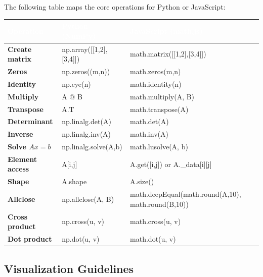 \documentclass[a4paper,11pt]{article}
\begin{document}
The following table maps the core operations for Python or JavaScript:

\renewcommand{\arraystretch}{1.25}
\begin{center}
\begin{tabularx}{\textwidth}{
  >{\bfseries\color{ippblue}}p{3.5cm}
  >{\ttfamily\small}X
  >{\ttfamily\small}X
}
\toprule
\rowcolor{ippblue}
\textcolor{white}{\textbf{Operation}} & \textcolor{white}{\textbf{Python (NumPy)}} & \textcolor{white}{\textbf{JavaScript (math.js)}} \\
\midrule
Create matrix       & np.array([[1,2],[3,4]])     & math.matrix([[1,2],[3,4]])    \\
\rowcolor{lightgray}
Zeros               & np.zeros((m,n))             & math.zeros(m,n)               \\
Identity            & np.eye(n)                   & math.identity(n)              \\
\rowcolor{lightgray}
Multiply            & A @ B                       & math.multiply(A, B)           \\
Transpose           & A.T                         & math.transpose(A)             \\
\rowcolor{lightgray}
Determinant         & np.linalg.det(A)            & math.det(A)                   \\
Inverse             & np.linalg.inv(A)            & math.inv(A)                   \\
\rowcolor{lightgray}
Solve $Ax=b$        & np.linalg.solve(A,b)        & math.lusolve(A, b)            \\
Element access      & A[i,j]                      & A.get([i,j]) or A.\_data[i][j] \\
\rowcolor{lightgray}
Shape               & A.shape                     & A.size()                      \\
Allclose            & np.allclose(A, B)           & math.deepEqual(math.round(A,10), math.round(B,10)) \\
\rowcolor{lightgray}
Cross product       & np.cross(u, v)              & math.cross(u, v)              \\
Dot product         & np.dot(u, v)                & math.dot(u, v)                \\
\bottomrule
\end{tabularx}
\end{center}

\subsection{Visualization Guidelines}
\end{document}
